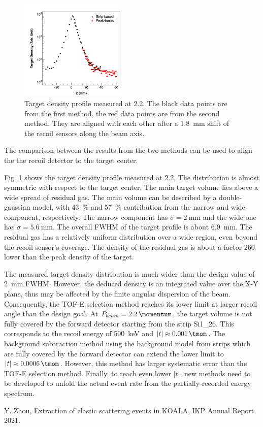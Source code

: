 \documentclass[fleqn,twocolumn,a4paper]{ikpar}
\begin{document}
\begin{figure}[t!]
  \centering
	\includegraphics[width=0.45\textwidth]{./target_density_result.png}
  \caption{Target density profile measured at \SI{2.2}{\momentum}. The black
    data points are from the first method, the red data points are from the
    second method. They are aligned with each other after a \SI{1.8}{\mm} shift of
    the recoil sensors along the beam axis.}
  \label{fig:target_density_result}
\end{figure}
The comparison between the results from the two methods can be used to align the the recoil detector to the target center.

\par
\medskip

Fig. \ref{fig:target_density_result} shows the target density profile measured at
\SI{2.2}{\momentum}.
The distribution is almost symmetric with respect to the target center.
The main target volume lies above a wide spread of residual gas.
The main volume can be described by a double-gaussian model, with
\SI{43}{\percent} and \SI{57}{\percent} contribution from the narrow and wide
component, respectively.
The narrow component has $\sigma = \SI{2}{\mm}$ and the wide one has $\sigma = \SI{5.6}{\mm}$.
The overall FWHM of the target profile is about \SI{6.9}{mm}.
The residual gas has a relatively uniform distribution over a wide region, even
beyond the recoil sensor's coverage.
The density of the residual gas is about a factor 260 lower than the peak density of the target.

\par
\medskip

The measured target density distribution is much wider than the design value of \SI{2}{\mm} FWHM.
However, the deduced density is an integrated value over the X-Y plane, thus
may be affected by the finite angular dispersion of the beam.
Consequently, the TOF-E selection method reaches its lower limit at larger recoil angle than the design goal.
At $P_{beam}=\SI{2.2}{\momentum}$, the target volume is not fully covered by
the forward detector starting from the strip Si1\_26.
This corresponds to the recoil energy of \SI{500}{\keV} and $|t| \approx \SI{0.001}{\tmom}$.
The background subtraction method using the background model from strips which
are fully covered by the forward detector can extend the lower limit to $|t| \approx \SI{0.0006}{\tmom}$.
However, this method has larger systematic error than the TOF-E selection method.
Finally, to reach even lower $|t|$, new methods need to be developed to unfold the
actual event rate from the partially-recorded energy spectrum.

\par
\medskip

\begin{thebibliography}{99}
 Y. Zhou, Extraction of elastic scattering events in KOALA, IKP Annual Report 2021.
\end{thebibliography}
\end{document}
